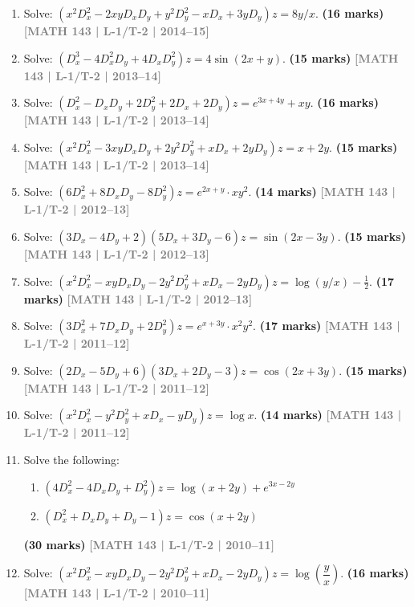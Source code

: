 \documentclass[12pt,a4paper]{article}
\newcommand{\yr}[1]{\hfill\textcolor{gray}{\small\textbf{[#1]}}}
\newcommand{\mk}[1]{\textcolor{orange!70!black}{\small\textbf{(#1 marks)}}}
\begin{document}
\begin{enumerate}
\item Solve: $(x^{2}D_{x}^{2}-2xyD_{x}D_{y}+y^{2}D_{y}^{2}-xD_{x}+3yD_{y})z=8y/x$.
\mk{16\textonehalf} \yr{MATH 143 | L-1/T-2 | 2014--15}

\item Solve: $(D_{x}^{3}-4D_{x}^{2}D_{y}+4D_{x}D_{y}^{2})z=4\sin(2x+y)$.
\mk{15} \yr{MATH 143 | L-1/T-2 | 2013--14}

\item Solve: $(D_{x}^{2}-D_{x}D_{y}+2D_{y}^{2}+2D_{x}+2D_{y})z=e^{3x+4y}+xy$.
\mk{16\textonehalf} \yr{MATH 143 | L-1/T-2 | 2013--14}

\item Solve: $(x^{2}D_{x}^{2}-3xyD_{x}D_{y}+2y^{2}D_{y}^{2}+xD_{x}+2yD_{y})z=x+2y$.
\mk{15} \yr{MATH 143 | L-1/T-2 | 2013--14}

\item Solve: $(6D_{x}^{2}+8D_{x}D_{y}-8D_{y}^{2})z=e^{2x+y}\cdot xy^{2}$.
\mk{14} \yr{MATH 143 | L-1/T-2 | 2012--13}

\item Solve: $(3D_{x}-4D_{y}+2)(5D_{x}+3D_{y}-6)z=\sin(2x-3y)$.
\mk{15} \yr{MATH 143 | L-1/T-2 | 2012--13}

\item Solve: $(x^{2}D_{x}^{2}-xyD_{x}D_{y}-2y^{2}D_{y}^{2}+xD_{x}-2yD_{y})z=\log(y/x)-\tfrac{1}{2}$.
\mk{17\textonehalf} \yr{MATH 143 | L-1/T-2 | 2012--13}

\item Solve: $(3D_{x}^{2}+7D_{x}D_{y}+2D_{y}^{2})z=e^{x+3y}\cdot x^{2}y^{2}$.
\mk{17\textonehalf} \yr{MATH 143 | L-1/T-2 | 2011--12}

\item Solve: $(2D_{x}-5D_{y}+6)(3D_{x}+2D_{y}-3)z=\cos(2x+3y)$.
\mk{15} \yr{MATH 143 | L-1/T-2 | 2011--12}

\item Solve: $(x^{2}D_{x}^{2}-y^{2}D_{y}^{2}+xD_{x}-yD_{y})z=\log x$.
\mk{14} \yr{MATH 143 | L-1/T-2 | 2011--12}

\item Solve the following:
\begin{enumerate}
  \item $(4D_{x}^{2}-4D_{x}D_{y}+D_{y}^{2})z=\log(x+2y)+e^{3x-2y}$
  \item $(D_{x}^{2}+D_{x}D_{y}+D_{y}-1)z=\cos(x+2y)$
\end{enumerate}
\mk{30} \yr{MATH 143 | L-1/T-2 | 2010--11}

\item Solve: $(x^{2}D_{x}^{2}-xyD_{x}D_{y}-2y^{2}D_{y}^{2}+xD_{x}-2yD_{y})z=\log\!\left(\dfrac{y}{x}\right)$.
\mk{16\textonehalf} \yr{MATH 143 | L-1/T-2 | 2010--11}

\end{enumerate}
\end{document}

